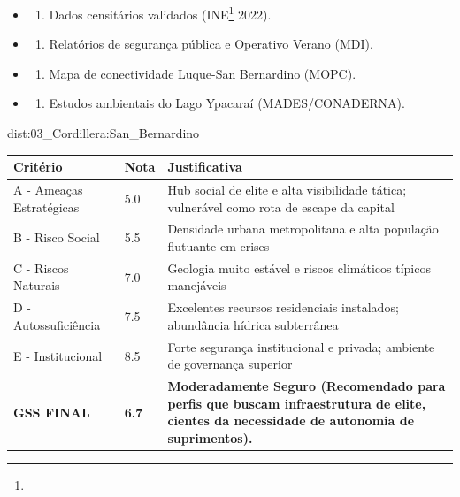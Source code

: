 {\begin{itemize}
\tightlist
\item
  \begin{enumerate}
  \def\labelenumi{\arabic{enumi})}
  \tightlist
  \item
    Dados censitários validados (INE\footnote{\fineINE} 2022).
  \end{enumerate}
\item
  \begin{enumerate}
  \def\labelenumi{\arabic{enumi})}
  \setcounter{enumi}{1}
  \tightlist
  \item
    Relatórios de segurança pública e Operativo Verano (MDI).
  \end{enumerate}
\item
  \begin{enumerate}
  \def\labelenumi{\arabic{enumi})}
  \setcounter{enumi}{2}
  \tightlist
  \item
    Mapa de conectividade Luque-San Bernardino (MOPC).
  \end{enumerate}
\item
  \begin{enumerate}
  \def\labelenumi{\arabic{enumi})}
  \setcounter{enumi}{3}
  \tightlist
  \item
    Estudos ambientais do Lago Ypacaraí (MADES/\allowbreak CONADERNA).
  \end{enumerate}
\end{itemize}}{dist:03_Cordillera:San_Bernardino}
\begin{table}[ht!]
\small \begin{tabular}{p{3.0cm}p{0.8cm}p{6.0cm}} \toprule
\textbf{Critério} & \textbf{Nota} & \textbf{Justificativa} \\ \midrule
A - Ameaças Estratégicas & 5.0 & Hub social de elite e alta visibilidade tática; vulnerável como rota de escape da capital \\
B - Risco Social & 5.5 & Densidade urbana metropolitana e alta população flutuante em crises \\
C - Riscos Naturais & 7.0 & Geologia muito estável e riscos climáticos típicos manejáveis \\
D - Autossuficiência & 7.5 & Excelentes recursos residenciais instalados; abundância hídrica subterrânea \\
E - Institucional & 8.5 & Forte segurança institucional e privada; ambiente de governança superior \\
\midrule \textbf{GSS FINAL} & \textbf{6.7} & \textbf{Moderadamente Seguro (Recomendado para perfis que buscam infraestrutura de elite, cientes da necessidade de autonomia de suprimentos).} \\ \bottomrule \end{tabular}
\end{table}
